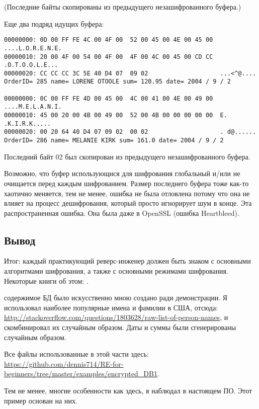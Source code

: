 (Последние байты  скопированы из предыдущего незашифрованного буфера.)

Еще два подряд идущих буфера:

\begin{lstlisting}
00000000: 0D 00 FF FE 4C 00 4F 00  52 00 45 00 4E 00 45 00  ....L.O.R.E.N.E.
00000010: 20 00 4F 00 54 00 4F 00  4F 00 4C 00 45 00 CD CC   .O.T.O.O.L.E...
00000020: CC CC CC 3C 5E 40 D4 07  09 02                    ...<^@....
OrderID= 285 name= LORENE OTOOLE sum= 120.95 date= 2004 / 9 / 2

00000000: 0C 00 FF FE 4D 00 45 00  4C 00 41 00 4E 00 49 00  ....M.E.L.A.N.I.
00000010: 45 00 20 00 4B 00 49 00  52 00 4B 00 00 00 00 00  E. .K.I.R.K.....
00000020: 00 20 64 40 D4 07 09 02  00 02                    . d@......
OrderID= 286 name= MELANIE KIRK sum= 161.0 date= 2004 / 9 / 2
\end{lstlisting}

Последний байт 02 был скопирован из предыдущего незашифрованного буфера.

Возможно, что буфер использующися для шифрования глобальный и/или не очищается перед каждым шифрованием.
Размер последнего буфера тоже как-то хаотично меняется, тем не менее, ошибка не была отловлена потому что она не влияет
на процесс дешифрования, который просто игнорирует шум в конце.
Эта распространенная ошибка.
Она была даже в OpenSSL (ошибка Heartbleed).

\subsection{Вывод}

Итог:
каждый практикующий реверс-инженер должен быть знаком с основными алгоритмами шифрования, а также с основными режимами
шифрования.
Некоторые книги об этом: .

 содержимое БД было искусственно мною создано ради демонстрации.
Я использовал наиболее популярные имена и фамилии в США, отсюда: \url{http://stackoverflow.com/questions/1803628/raw-list-of-person-names},
и скомбинировал их случайным образом.
Даты и суммы были сгенерированы случайным образом.

Все файлы использованные в этой части здесь:
\url{https://github.com/dennis714/RE-for-beginners/tree/master/examples/encrypted_DB1}.

Тем не менее, многие особенности как здесь, я наблюдал в настоящем ПО.
Этот пример основан на них.

